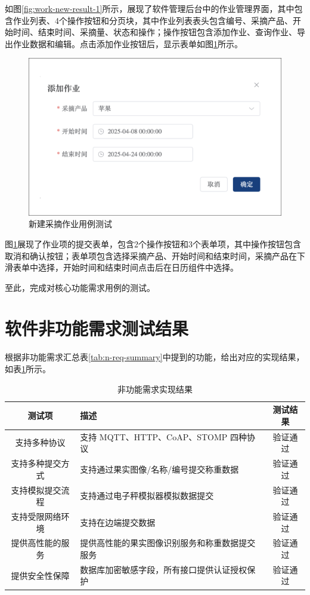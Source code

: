 如图\ref{fig:work-new-result-1}所示，展现了软件管理后台中的作业管理界面，其中包含作业列表、4个操作按钮和分页块，其中作业列表表头包含编号、采摘产品、开始时间、结束时间、采摘量、状态和操作；操作按钮包含添加作业、查询作业、导出作业数据和编辑。点击添加作业按钮后，显示表单如图\ref{fig:work-new-result-2}所示。

\begin{figure}[H]
    \centering
    \includegraphics[width=0.8\linewidth]{../result/work-new-result-2.png}
    \caption{新建采摘作业用例测试}
    \label{fig:work-new-result-2}
\end{figure}

图\ref{fig:work-new-result-2}展现了作业项的提交表单，包含2个操作按钮和3个表单项，其中操作按钮包含取消和确认按钮；表单项包含选择采摘产品、开始时间和结束时间，采摘产品在下滑表单中选择，开始时间和结束时间点击后在日历组件中选择。

至此，完成对核心功能需求用例的测试。

\section{软件非功能需求测试结果}

根据非功能需求汇总表\ref{tab:n-req-summary}中提到的功能，给出对应的实现结果，如表\ref{tab:test-n-req-summary}所示。

\begin{longtable}[ht]{|c|p{8cm}|c|}
\caption{非功能需求实现结果}
\label{tab:test-n-req-summary}
\\
\hline
测试项 & 描述 & 测试结果 \\\hline
支持多种协议 & 支持 MQTT、HTTP、CoAP、STOMP 四种协议 & 验证通过 \\\hline
支持多种提交方式 & 支持通过果实图像/名称/编号提交称重数据 & 验证通过 \\\hline
支持模拟提交流程 & 支持通过电子秤模拟器模拟数据提交 & 验证通过 \\\hline
支持受限网络环境 & 支持在边端提交数据 & 验证通过 \\\hline
提供高性能的服务 & 提供高性能的果实图像识别服务和称重数据提交服务 & 验证通过 \\\hline
提供安全性保障 & 数据库加密敏感字段，所有接口提供认证授权保护 & 验证通过 \\\hline
\end{longtable}

